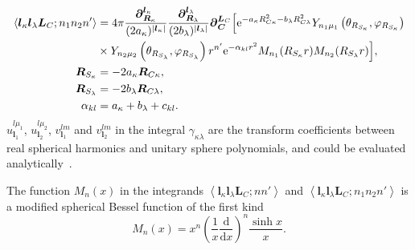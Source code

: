 \documentclass[a4paper,11pt,twoside,openright]{book}
\newcommand{\fixme}[1]{\textbf{\textit{\color{red} #1}}}
\begin{document}
\begin{align}
  \left\langle\boldsymbol{l}_{\kappa}\boldsymbol{l}_{\lambda}\boldsymbol{L}_{C};n_{1}n_{2}n'\right\rangle
  &=4\pi\frac{\boldsymbol{\partial}_{\boldsymbol{R}_{\kappa}}^{\boldsymbol{l}_{\kappa}}}%
      {(2a_{\kappa})^{|\boldsymbol{l}_{\kappa}|}}%
    \frac{\boldsymbol{\partial}_{\boldsymbol{R}_{\lambda}}^{\boldsymbol{l}_{\lambda}}}%
      {(2b_{\lambda})^{|\boldsymbol{l}_{\lambda}|}}%
    \boldsymbol{\partial}_{\boldsymbol{C}}^{\boldsymbol{L}_{C}}%
    \Bigl[\mathrm{e}^{-a_{\kappa}R_{C\kappa}^{2}-b_{\lambda}R_{C\lambda}^{2}}%
    Y_{n_{1}\mu_1}\left(\theta_{R_{S_{\kappa}}},\varphi_{R_{S_{\kappa}}}\right)\\
  &\times Y_{n_{2}\mu_2}\left(\theta_{R_{S_{\lambda}}},\varphi_{R_{S_{\lambda}}}\right)%
    r^{n'}\mathrm{e}^{-\alpha_{kl}r^2}M_{n_1}(R_{S_{\kappa}}r)M_{n_2}(R_{S_{\lambda}}r)\Bigr],\nonumber\\
  \boldsymbol{R}_{S_{\kappa}}&=-2a_{\kappa}\boldsymbol{R}_{C\kappa},\\
  \boldsymbol{R}_{S_{\lambda}}&=-2b_{\lambda}\boldsymbol{R}_{C\lambda},\\
  \alpha_{kl}&=a_{\kappa}+b_{\lambda}+c_{kl}.
\end{align}
$u_{\boldsymbol{l}_1}^{l\mu_1}$, $u_{\boldsymbol{l}_2}^{l\mu_2}$, $v_{\boldsymbol{l}_1}^{lm}$
and $v_{\boldsymbol{l}_2}^{lm}$ in the integral $\gamma_{\kappa\lambda}$ are the transform
coefficients between real spherical harmonics and unitary sphere polynomials, and could be
evaluated analytically~\cite{Flores-Moreno:JCC27:1009}.

The function $M_{n}(x)$ in the integrands $\left\langle\boldsymbol{l}_{\kappa}\boldsymbol{l}_{\lambda}\boldsymbol{L}_{C};nn'\right\rangle$
and $\left\langle\boldsymbol{l}_{\kappa}\boldsymbol{l}_{\lambda}\boldsymbol{L}_{C};n_{1}n_{2}n'\right\rangle$
is a modified spherical Bessel function of the first kind
\begin{equation}
  M_{n}(x)=x^{n}\left(\frac{1}{x}\frac{\mathrm{d}}{\mathrm{d}x}\right)^{n}\frac{\sinh x}{x}.
\end{equation}
\end{document}
